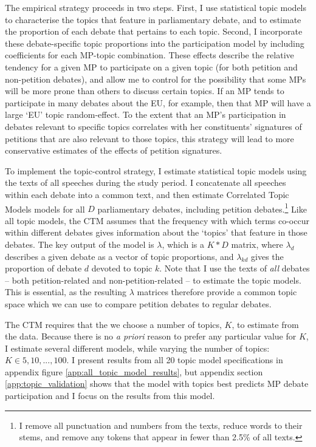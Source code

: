 \documentclass[12pt]{article}
\begin{document}
The empirical strategy proceeds in two steps. First, I use statistical topic models to characterise the topics that feature in parliamentary debate, and to estimate the proportion of each debate that pertains to each topic. Second, I incorporate these debate-specific topic proportions into the participation model by including coefficients for each MP-topic combination. These effects describe the relative tendency for a given MP to participate on a given topic (for both petition and non-petition debates), and allow me to control for the possibility that some MPs will be more prone than others to discuss certain topics. If an MP tends to participate in many debates about the EU, for example, then that MP will have a large `EU' topic random-effect. To the extent that an MP's participation in debates relevant to specific topics correlates with her constituents' signatures of petitions that are also relevant to those topics, this strategy will lead to more conservative estimates of the effects of petition signatures. 

To implement the topic-control strategy, I estimate statistical topic models using the texts of all speeches during the study period. I concatenate all speeches within each debate into a common text, and then estimate Correlated Topic Models \citep{blei2005correlated} models for all $D$ parliamentary debates, including petition debates.\footnote{I remove all punctuation and numbers from the texts, reduce words to their stems, and remove any tokens that appear in fewer than 2.5\% of all texts.} Like all topic models, the CTM assumes that the frequency with which terms co-occur within different debates gives information about the `topics' that feature in those debates. The key output of the model is $\lambda$, which is a $K*D$ matrix, where $\lambda_d$ describes a given debate as a vector of topic proportions, and $\lambda_{kd}$ gives the proportion of debate $d$ devoted to topic $k$. Note that I use the texts of \emph{all} debates -- both petition-related and non-petition-related -- to estimate the topic models. This is essential, as the resulting $\lambda$ matrices therefore provide a common topic space which we can use to compare petition debates to regular debates. 

The CTM requires that the we choose a number of topics, $K$, to estimate from the data. Because there is no \emph{a priori} reason to prefer any particular value for $K$, I estimate several different models, while varying the number of topics: $K \in 5, 10,..., 100$. I present results from all 20 topic model specifications in appendix figure \ref{app:all_topic_model_results}, but appendix section \ref{app:topic_validation} shows that the model with topics best predicts MP debate participation and I focus on the results from this model.
\end{document}
